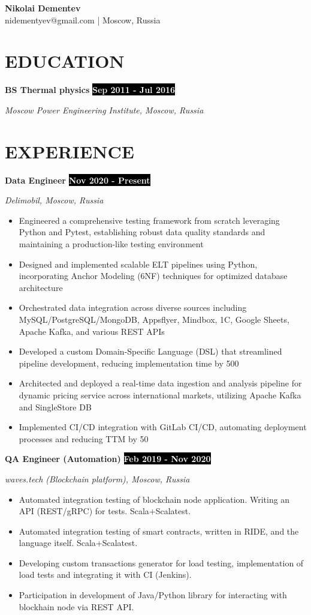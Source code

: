 \documentclass[11pt,a4paper]{article}
\newcommand{\timeperiod}[1]{%
    \hfill{\small\colorbox{black}{\textcolor{white}{\textbf{#1}}}}\par%
}
\newcommand{\jobsep}{\vspace{1.5em}}
\begin{document}
\begin{flushright}
{\huge\textbf{Nikolai Dementev}}\\[4pt]
{\normalsize nidementyev@gmail.com | Moscow, Russia}
\end{flushright}

\section{EDUCATION}
\textbf{BS Thermal physics}\timeperiod{Sep 2011 - Jul 2016}
\textit{Moscow Power Engineering Institute, Moscow, Russia}

\section{EXPERIENCE}
\textbf{Data Engineer}\timeperiod{Nov 2020 - Present}
\textit{Delimobil, Moscow, Russia}
\begin{itemize}
    \item Engineered a comprehensive testing framework from scratch leveraging Python and Pytest, establishing robust data quality standards and maintaining a production-like testing environment
    \item Designed and implemented scalable ELT pipelines using Python, incorporating Anchor Modeling (6NF) techniques for optimized database architecture
    \item Orchestrated data integration across diverse sources including MySQL/PostgreSQL/MongoDB, Appsflyer, Mindbox, 1C, Google Sheets, Apache Kafka, and various REST APIs
    \item Developed a custom Domain-Specific Language (DSL) that streamlined pipeline development, reducing implementation time by 500%
    \item Architected and deployed a real-time data ingestion and analysis pipeline for dynamic pricing service across international markets, utilizing Apache Kafka and SingleStore DB
    \item Implemented CI/CD integration with GitLab CI/CD, automating deployment processes and reducing TTM by 50%
\end{itemize}

\jobsep
\textbf{QA Engineer (Automation)}\timeperiod{Feb 2019 - Nov 2020}
\textit{waves.tech (Blockchain platform), Moscow, Russia}
\begin{itemize}
    \item Automated integration testing of blockchain node application. Writing an API (REST/gRPC) for tests. Scala+Scalatest.
    \item Automated integration testing of smart contracts, written in RIDE, and the language itself. Scala+Scalatest.
    \item Developing custom transactions generator for load testing, implementation of load tests and integrating it with CI (Jenkins).
    \item Participation in development of Java/Python library for interacting with blockhain node via REST API.
\end{itemize}
\end{document}
